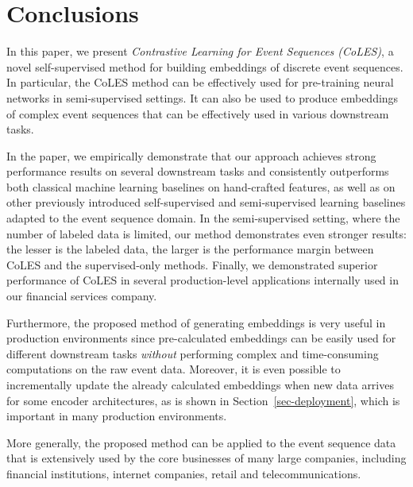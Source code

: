 \documentclass[sigconf]{acmart}
\begin{document}
\section{Conclusions} \label{sec-conclusions}

In this paper, we present \emph{Contrastive Learning for Event Sequences (CoLES)}, a novel self-supervised method for building embeddings of discrete event sequences.
In particular, the CoLES method can be effectively used for pre-training neural networks in semi-supervised settings. It can also be used to produce embeddings of complex event sequences that can be effectively used in various downstream tasks.

In the paper, we empirically demonstrate that our approach achieves strong performance results on several downstream tasks and consistently outperforms both classical machine learning baselines on hand-crafted features, as well as on other  previously introduced  self-supervised and semi-supervised learning baselines adapted to the event sequence domain.
In the semi-supervised setting, where the number of labeled data is limited, our method demonstrates even stronger results: the lesser is the labeled data, the larger is the performance margin between CoLES and the supervised-only methods.
Finally, we demonstrated superior performance of CoLES in several production-level applications internally used in our financial services company.

Furthermore, the proposed method of generating embeddings is very useful in production environments since pre-calculated embeddings can be easily used for different downstream tasks \emph{without} performing complex and time-consuming computations on the raw event data.
Moreover, it is even possible to incrementally update the already calculated embeddings when new data arrives for some encoder architectures, as is shown in Section~\ref{sec-deployment}, which is important in many production environments.

More generally, the proposed method can be applied to the event sequence data that is extensively used by the core businesses of many large companies, including financial institutions, internet companies, retail and telecommunications.


\end{document}
